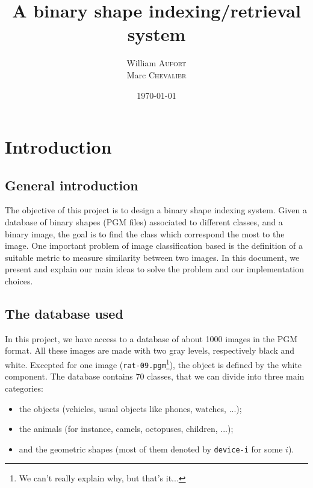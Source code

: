 

\title{A binary shape indexing/retrieval system}
\author{
    William \textsc{Aufort}\\
    Marc \textsc{Chevalier}
}
\date{\today}


\maketitle

\section*{Introduction}

\subsection*{General introduction}

The objective of this project is to design a binary shape indexing system. Given a database of binary shapes (PGM files) associated to different classes, and a binary image, the goal is to find the class which correspond the most to the image.
One important problem of image classification based is the definition of a suitable metric to measure similarity between two images. In this document, we present and explain our main ideas to solve the problem and our implementation choices.

\subsection*{The database used}

In this project, we have access to a database of about 1000 images in the PGM format. All these images are made with two gray levels, respectively black and white. Excepted for one image (\texttt{rat-09.pgm}\footnote{We can't really explain why, but that's it...}), the object is defined by the white component. The database contains 70 classes, that we can divide into three main categories:
\begin{itemize}
	\item the objects (vehicles, usual objects like phones, watches, ...);
	\item the animals (for instance, camels, octopuses, children, ...);
	\item and the geometric shapes (most of them denoted by \texttt{device-i} for some $i$).
\end{itemize}

